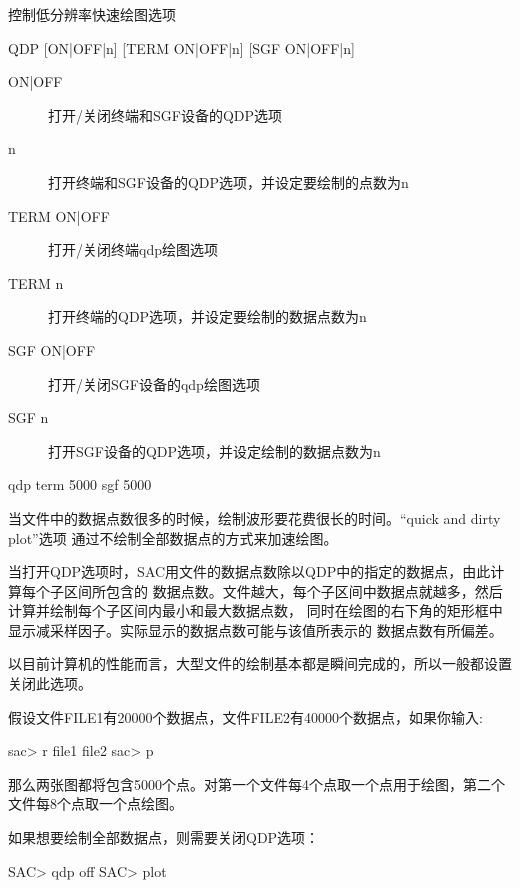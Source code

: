 \label{cmd:qdp}

控制低分辨率快速绘图选项

\begin{SACSTX}
QDP [ON|OFF|n] [TERM ON|OFF|n] [SGF ON|OFF|n]
\end{SACSTX}

\begin{description}
\item [ON|OFF] 打开/关闭终端和SGF设备的QDP选项 
\item [n] 打开终端和SGF设备的QDP选项，并设定要绘制的点数为n 
\item [TERM ON|OFF] 打开/关闭终端qdp绘图选项
\item [TERM n] 打开终端的QDP选项，并设定要绘制的数据点数为n 
\item [SGF ON|OFF] 打开/关闭SGF设备的qdp绘图选项 
\item [SGF n] 打开SGF设备的QDP选项，并设定绘制的数据点数为n 
\end{description}

\begin{SACDFT}
qdp term 5000 sgf 5000
\end{SACDFT}

当文件中的数据点数很多的时候，绘制波形要花费很长的时间。``quick and dirty plot''选项
通过不绘制全部数据点的方式来加速绘图。

当打开QDP选项时，SAC用文件的数据点数除以QDP中的指定的数据点，由此计算每个子区间所包含的
数据点数。文件越大，每个子区间中数据点就越多，然后计算并绘制每个子区间内最小和最大数据点数，
同时在绘图的右下角的矩形框中显示减采样因子。实际显示的数据点数可能与该值所表示的
数据点数有所偏差。

以目前计算机的性能而言，大型文件的绘制基本都是瞬间完成的，所以一般都设置关闭此选项。

假设文件FILE1有20000个数据点，文件FILE2有40000个数据点，如果你输入:
\begin{SACCode}
sac> r file1 file2
sac> p
\end{SACCode}
那么两张图都将包含5000个点。对第一个文件每4个点取一个点用于绘图，第二个文件每8个点取一个点绘图。

如果想要绘制全部数据点，则需要关闭QDP选项：
\begin{SACCode}
SAC> qdp off
SAC> plot
\end{SACCode}
